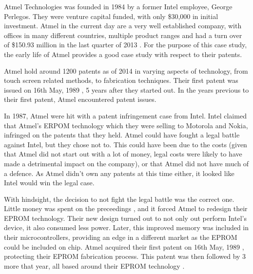 
{}


Atmel Technologies was founded in 1984 by a former Intel employee, George Perlegos.
They were venture capital funded, with only \$30,000 in initial investment.
Atmel in the current day are a very well established company, with offices in many different countries, multiple product ranges and had a turn over of \$150.93 million in the last quarter of 2013 \cite{atmel:profit}.
For the purpose of this case study, the early life of Atmel provides a good case study with respect to their patents.


Atmel hold around 1200 patents as of 2014 \citeneeded in varying aspects of technology, from touch screen related methods, to fabrication techniques.
Their first patent was issued on 16th May, 1989 \citeneeded, 5 years after they started out.
In the years previous to their first patent, Atmel encountered patent issues.

In 1987, Atmel were hit with a patent infringement case from Intel.
Intel claimed that Atmel's ERPOM technology which they were selling to Motorola and Nokia, infringed on the patents that they held.
Atmel could have fought a legal battle against Intel, but they chose not to. 
This could have been due to the costs (given that Atmel did not start out with a lot of money, legal costs were likely to have made a detrimental impact on the company), or that Atmel did not have much of a defence.
As Atmel didn't own any patents at this time either, it looked like Intel would win the legal case. 

With hindsight, the decision to not fight the legal battle was the correct one. 
Little money was spent on the preceedings , and it forced Atmel to redesign their EPROM technology.
Their new design turned out to not only out perform Intel's device, it also consumed less power.
Later, this improved memory was included in their microcontrollers, providing an edge in a different market as the EPROM could be included on chip.
Atmel acquired their first patent on 16th May, 1989 \citeneeded, protecting their EPROM fabrication process. 
This patent was then followed by 3 more that year, all based around their EPROM technology \citeneeded.

